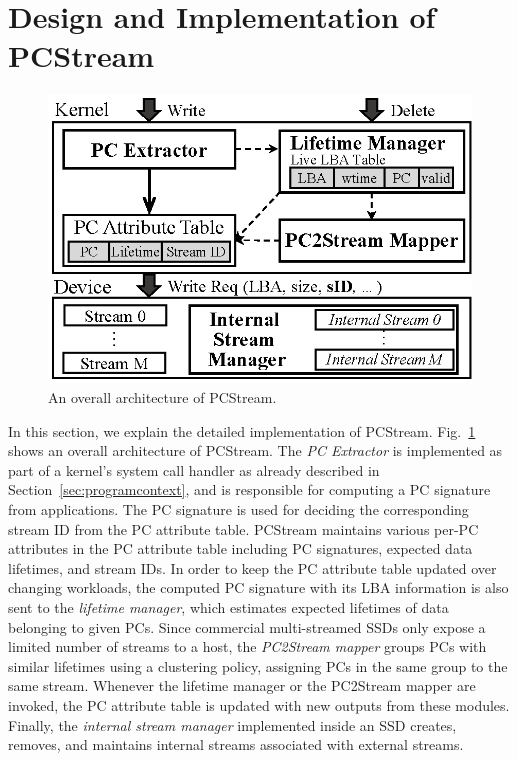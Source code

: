 \vspace{-10pt}
\section{Design and Implementation of \textsf{PCStream}}
\vspace{-5pt}

\begin{figure}[t]
	\centering
	\includegraphics[width=0.7\linewidth]{figure/overview_1}
	\vspace{-9pt}
	\caption{An overall architecture of \textsf{\small PCStream}.}
	\label{fig:architecture}
	\vspace{-15pt}
\end{figure}


In this section, we explain the detailed implementation of \textsf{\small
PCStream}.  Fig.~\ref{fig:architecture} shows an overall architecture of
\textsf{\small PCStream}. The \textit{PC Extractor} is implemented as part of a
kernel's system call handler as already described in
Section~\ref{sec:programcontext}, and is responsible for computing a PC
signature from applications.  The PC signature is used for deciding the
corresponding stream ID from
the PC attribute table.  \textsf{\small PCStream} maintains various per-PC
attributes in the PC attribute table including PC signatures, expected data
lifetimes, and stream IDs.  In order to keep the PC attribute table updated
over changing workloads, the computed PC signature with its LBA information is
also sent to the {\it lifetime manager}, which estimates expected lifetimes of
data belonging to given PCs.  Since commercial multi-streamed SSDs only expose
a limited number of streams to a host, the \textit{PC2Stream mapper} groups PCs
with similar lifetimes using a clustering policy, assigning PCs in the same
group to the same stream.  Whenever the lifetime manager or the PC2Stream
mapper are invoked, the PC attribute table is updated with new outputs from
these modules.  Finally, the \textit{internal stream manager} implemented
inside an SSD creates, removes, and maintains internal streams associated with
external streams.

